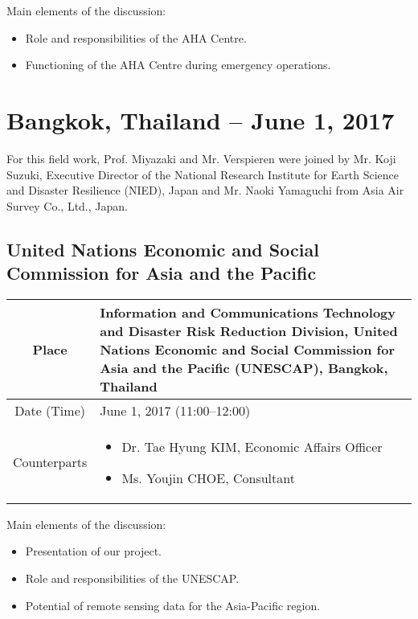 Main elements of the discussion:

\begin{itemize}

\item Role and responsibilities of the AHA Centre.

\item Functioning of the AHA Centre during emergency operations.

\end{itemize}



\section{Bangkok, Thailand -- June 1, 2017}

For this field work, Prof. Miyazaki and Mr. Verspieren were joined by Mr. Koji Suzuki, Executive Director of the National Research Institute for Earth Science and Disaster Resilience (NIED), Japan and Mr. Naoki Yamaguchi from Asia Air Survey Co., Ltd., Japan.

\subsection{United Nations Economic and Social Commission for Asia and the Pacific}

\begin{table}[H]
   \centering
   \begin{tabular}{| c | p{12 cm} |}
   \hline
    Place & Information and Communications Technology and Disaster Risk Reduction Division, United Nations Economic and Social Commission for Asia and the Pacific (UNESCAP), Bangkok, Thailand \\ \hline
    Date (Time) & June 1, 2017 (11:00--12:00) \\ \hline
    Counterparts & \begin{itemize} \item Dr. Tae Hyung KIM, Economic Affairs Officer \item Ms. Youjin CHOE, Consultant \end{itemize} \\ \hline   
   \end{tabular}
\end{table}

Main elements of the discussion:

\begin{itemize}

\item Presentation of our project.

\item Role and responsibilities of the UNESCAP.

\item Potential of remote sensing data for the Asia-Pacific region.

\end{itemize}



